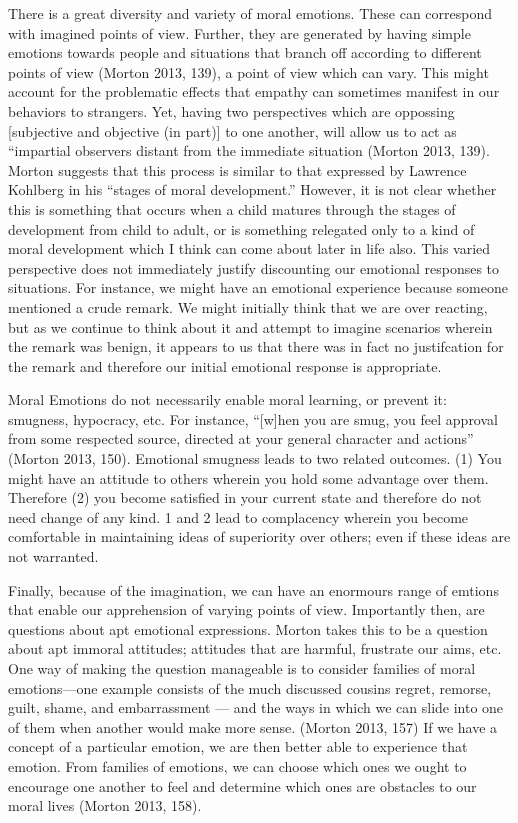 \documentclass[
  letterpaper,
  DIV=11,
  numbers=noendperiod]{scrartcl}
\theoremstyle{remark}
\begin{document}
There is a great diversity and variety of moral emotions. These can
correspond with imagined points of view. Further, they are generated by
having simple emotions towards people and situations that branch off
according to different points of view (Morton 2013, 139), a point of
view which can vary. This might account for the problematic effects that
empathy can sometimes manifest in our behaviors to strangers. Yet,
having two perspectives which are oppossing {[}subjective and objective
(in part){]} to one another, will allow us to act as ``impartial
observers distant from the immediate situation (Morton 2013, 139).
Morton suggests that this process is similar to that expressed by
Lawrence Kohlberg in his ``stages of moral development.'' However, it is
not clear whether this is something that occurs when a child matures
through the stages of development from child to adult, or is something
relegated only to a kind of moral development which I think can come
about later in life also. This varied perspective does not immediately
justify discounting our emotional responses to situations. For instance,
we might have an emotional experience because someone mentioned a crude
remark. We might initially think that we are over reacting, but as we
continue to think about it and attempt to imagine scenarios wherein the
remark was benign, it appears to us that there was in fact no
justifcation for the remark and therefore our initial emotional response
is appropriate.

Moral Emotions do not necessarily enable moral learning, or prevent it:
smugness, hypocracy, etc. For instance, ``{[}w{]}hen you are smug, you
feel approval from some respected source, directed at your general
character and actions'' (Morton 2013, 150). Emotional smugness leads to
two related outcomes. (1) You might have an attitude to others wherein
you hold some advantage over them. Therefore (2) you become satisfied in
your current state and therefore do not need change of any kind. 1 and 2
lead to complacency wherein you become comfortable in maintaining ideas
of superiority over others; even if these ideas are not warranted.

Finally, because of the imagination, we can have an enormours range of
emtions that enable our apprehension of varying points of view.
Importantly then, are questions about apt emotional expressions. Morton
takes this to be a question about apt immoral attitudes; attitudes that
are harmful, frustrate our aims, etc. One way of making the question
manageable is to consider families of moral emotions---one example
consists of the much discussed cousins regret, remorse, guilt, shame,
and embarrassment --- and the ways in which we can slide into one of
them when another would make more sense. (Morton 2013, 157) If we have a
concept of a particular emotion, we are then better able to experience
that emotion. From families of emotions, we can choose which ones we
ought to encourage one another to feel and determine which ones are
obstacles to our moral lives (Morton 2013, 158).
\end{document}
